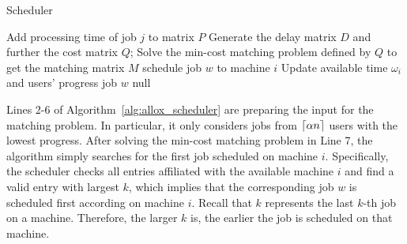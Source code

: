 \begin{algorithm}[H]
\small
\caption{\name Scheduler}
\label{alg:allox_scheduler}
\begin{algorithmic}[1]
    \State Add processing time of job $j$ to matrix $P$
    \EndFor
    \State Generate the delay matrix $D$ and further the cost matrix $Q$;
    \State Solve the min-cost matching problem defined by $Q$ to get the matching matrix $M$
     
         
          \State schedule job $w$ to machine $i$
          \State Update available time $\omega_i$ and users' progress
          \State \Return job $w$
        \EndIf
      \EndFor
    \EndFor
	\State \Return null
    \EndFunction
\end{algorithmic}
\end{algorithm}

Lines 2-6 of Algorithm~\ref{alg:allox_scheduler} are preparing the input for the matching problem. In particular, it only considers jobs from $\ceil*{\alpha n}$ users with the lowest progress. 
After solving the min-cost matching problem in Line 7, the algorithm simply searches for the first job scheduled on machine $i$. 
Specifically, the scheduler checks all entries affiliated with the available machine $i$ and find a valid entry with largest $k$, which implies that the corresponding job $w$ is scheduled first according on machine $i$. Recall that $k$ represents the last $k$-th job on a machine. Therefore, the larger $k$ is, the earlier the job is scheduled on that machine.

